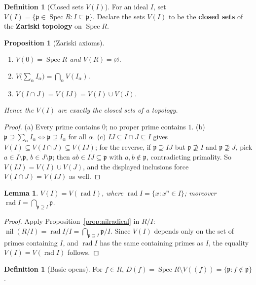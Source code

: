 \documentclass[11pt,a4paper]{article}
\newtheorem{lemma}[theorem]{Lemma}
\newtheorem{proposition}[theorem]{Proposition}
\theoremstyle{definition}
\newtheorem{definition}[theorem]{Definition}
\newcommand{\Spec}{\operatorname{Spec}}
\newcommand{\nil}{\operatorname{nil}}
\newcommand{\rad}{\operatorname{rad}}
\newcommand{\p}{\mathfrak{p}}
\begin{document}
	\begin{definition}[Closed sets $V(I)$]
		For an ideal $I$, set $V(I)=\{\p\in\Spec R:I\subseteq\p\}$. Declare the sets $V(I)$ to be the
		\textbf{closed sets} of the \textbf{Zariski topology} on $\Spec R$.
	\end{definition}
	
	\begin{proposition}[Zariski axioms]\label{prop:zariski}
		\begin{enumerate}[label=(\alph*)]
			\item $V(0)=\Spec R$ and $V(R)=\varnothing$.
			\item $V\!\big(\sum_\alpha I_\alpha\big)=\bigcap_\alpha V(I_\alpha)$.
			\item $V(I\cap J)=V(IJ)=V(I)\cup V(J)$.
		\end{enumerate}
		Hence the $V(I)$ are exactly the closed sets of a topology.
	\end{proposition}
	\begin{proof}
		(a) Every prime contains $0$; no proper prime contains $1$.
		(b) $\p\supseteq\sum_\alpha I_\alpha \iff \p\supseteq I_\alpha$ for all $\alpha$.
		(c) $IJ\subseteq I\cap J\subseteq I$ gives $V(I)\subseteq V(I\cap J)\subseteq V(IJ)$; for the reverse,
		if $\p\supseteq IJ$ but $\p\nsupseteq I$ and $\p\nsupseteq J$, pick $a\in I\setminus\p$, $b\in J\setminus\p$;
		then $ab\in IJ\subseteq\p$ with $a,b\notin\p$, contradicting primality. So $V(IJ)=V(I)\cup V(J)$,
		and the displayed inclusions force $V(I\cap J)=V(IJ)$ as well.
	\end{proof}
	
	\begin{lemma}\label{lem:V-radical}
		$V(I)=V(\rad I)$, where $\rad I=\{x:x^n\in I\}$; moreover $\rad I=\bigcap_{\p\supseteq I}\p$.
	\end{lemma}
	\begin{proof}
		Apply Proposition~\ref{prop:nilradical} in $R/I$: $\nil(R/I)=\rad I/I=\bigcap_{\p\supseteq I}\p/I$.
		Since $V(I)$ depends only on the set of primes containing $I$, and $\rad I$ has the same containing
		primes as $I$, the equality $V(I)=V(\rad I)$ follows.
	\end{proof}
	
	\begin{definition}[Basic opens]
		For $f\in R$, $D(f)=\Spec R\setminus V((f))=\{\p:f\notin\p\}$.
	\end{definition}
	
\end{document}
